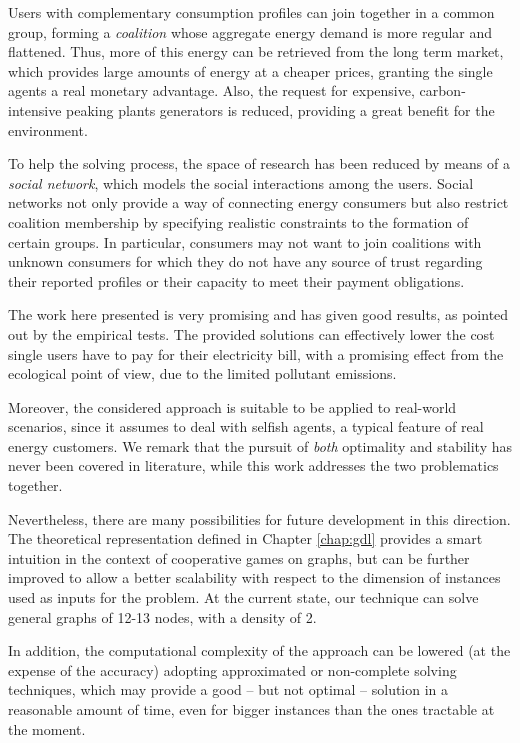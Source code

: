 \documentclass[11pt, twoside, titlepage, a4paper, openright]{report}
\begin{document}
Users with complementary consumption profiles can join together in a common group, forming a \textit{coalition} whose aggregate energy demand is more regular and flattened. 
Thus, more of this energy can be retrieved from the long term market, which provides large amounts of energy at a cheaper prices, granting the single agents a real monetary advantage. Also, the request for expensive, carbon-intensive peaking plants generators is reduced, providing a great benefit for the environment.

To help the solving process, the space of research has been reduced by means of a \textit{social network}, which models the social interactions among the users. 
Social networks not only provide a way of connecting
energy consumers but also restrict coalition membership by specifying
realistic constraints to the formation of certain groups. In
particular, consumers may not want to join coalitions with unknown consumers for
which they do not have any source of trust regarding their reported profiles or
their capacity to meet their payment obligations.

The work here presented is very promising and has given good results, as pointed out by the empirical tests. The provided solutions can effectively lower the cost single users have to pay for their electricity bill, with a promising effect from the ecological point of view, due to the limited pollutant emissions.

Moreover, the considered approach is suitable to be applied to real-world scenarios, since it assumes to deal with selfish agents, a typical feature of real energy customers. We remark that the pursuit of \textit{both} optimality and stability has never been covered in literature, while this work addresses the two problematics together.

\noindent Nevertheless, there are many possibilities for future development in this direction. The theoretical representation defined in Chapter \ref{chap:gdl} provides a smart intuition in the context of cooperative games on graphs, but can be further improved to allow a better scalability with respect to the dimension of instances used as inputs for the problem. At the current state, our technique can solve general graphs of 12-13 nodes, with a density of 2.

In addition, the computational complexity of the approach can be lowered (at the expense of the accuracy) adopting approximated or non-complete solving techniques, which may provide a good -- but not optimal -- solution in a reasonable amount of time, even for bigger instances than the ones tractable at the moment.
\end{document}
